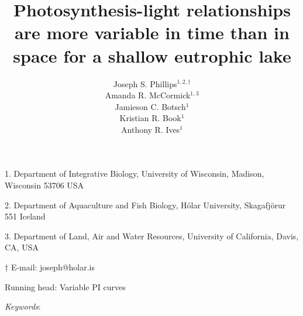 \documentclass[12pt]{article}
\title{Photosynthesis-light relationships are more variable in time than in space 
        for a shallow eutrophic lake}
\author{
Joseph S. Phillips$^{1,2,\dagger}$ \\
Amanda R. McCormick$^{1,3}$ \\
Jamieson C. Botsch$^{1}$ \\
Kristian R. Book$^{1}$ \\
Anthony R. Ives$^{1}$}
\date{}
\begin{document}
\raggedright
\setlength\parindent{0.25in}

\maketitle

\noindent{} 1. Department of Integrative Biology, University of Wisconsin, Madison, Wisconsin 53706 USA

\noindent{} 2. Department of Aquaculture and Fish Biology, H\'{o}lar University, Skagafj\"{o}r{\dh}ur 551 Iceland

\noindent{} 3. Department of Land, Air and Water Resources, 
University of California, Davis, CA, USA

\noindent{} $\dagger$ E-mail: joseph@holar.is

\bigskip

Running head: {Variable PI curves}

\linenumbers{}

\clearpage








\bigskip

\textit{Keywords}: {}

\clearpage











\end{document}
